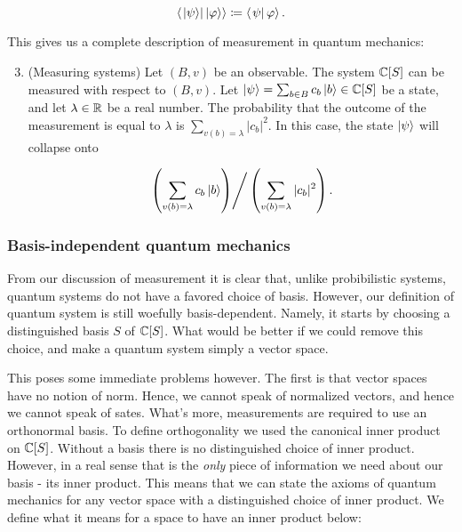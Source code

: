 $$\left< \left. \ket{\psi} \right| \ket{\varphi}\right>\coloneqq \left< \left. \psi \right| \varphi \right>.$$

This gives us a complete description of measurement in quantum mechanics:

\begin{enumerate}[1''.]
\setcounter{enumi}{2}

\item (Measuring systems) Let $(B,v)$ be an observable. The system $\mathbb{C}[S]$ can be measured with respect to $(B,v)$. Let $\ket{\psi}=\sum_{b\in B}c_b \ket{b}\in \mathbb{C}[S]$ be a state, and let $\lambda\in \mathbb{R}$ be a real number. The probability that the outcome of the measurement is equal to $\lambda$ is $\sum_{v(b)=\lambda}|c_b|^2$. In this case, the state $\ket{\psi}$ will collapse onto

$$\left.\left(\sum_{v(b)=\lambda}c_b \ket{b}\right)\right/ \left(\sum_{v(b)=\lambda}|c_b|^2\right).$$
\end{enumerate}



\subsubsection{Basis-independent quantum mechanics}

From our discussion of measurement it is clear that, unlike probibilistic systems, quantum systems do not have a favored choice of basis. However, our definition of quantum system is still woefully basis-dependent. Namely, it starts by choosing a distinguished basis $S$ of $\mathbb{C}[S]$. What would be better if we could remove this choice, and make a quantum system simply a vector space.

This poses some immediate problems however. The first is that vector spaces have no notion of norm. Hence, we cannot speak of normalized vectors, and hence we cannot speak of sates. What's more, measurements are required to use an orthonormal basis. To define orthogonality we used the canonical inner product on $\mathbb{C}[S]$. Without a basis there is no distinguished choice of inner product. However, in a real sense that is the \textit{only} piece of information we need about our basis - its inner product. This means that we can state the axioms of quantum mechanics for any vector space with a distinguished choice of inner product. We define what it means for a space to have an inner product below:

